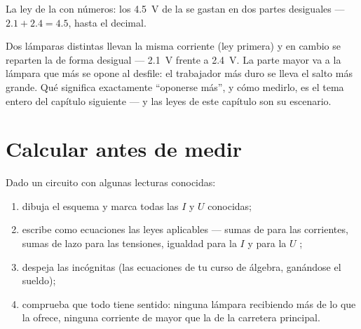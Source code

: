 \begin{omfigure}

{\small La ley de la   con números: los
\qty{4.5}{V} de la  se gastan en dos partes desiguales ---
$2.1 + 2.4 = 4.5$, hasta el decimal.}
\end{omfigure}

\begin{example}\label{ex:g8:circuit-laws:unequal}
Dos lámparas distintas  llevan la misma corriente (ley
primera) y en cambio se reparten la  de forma desigual
--- \qty{2.1}{V} frente a \qty{2.4}{V}. La parte mayor va a la lámpara
que más se opone al desfile: el trabajador más duro se lleva el salto
más grande. Qué significa exactamente ``oponerse más'', y cómo
medirlo, es el tema entero del capítulo siguiente --- y las leyes
de este capítulo son su escenario.
\end{example}

\section{Calcular antes de medir}

\begin{method}\label{met:g8:circuit-laws:solve}
Dado un circuito con algunas lecturas conocidas:
\begin{enumerate}
  \item dibuja el esquema y marca todas las $I$ y $U$ conocidas;
  \item escribe como ecuaciones las leyes aplicables --- sumas de
         para las corrientes, sumas de lazo para las
        tensiones, igualdad para la $I$  y para la $U$
        ;
  \item despeja las incógnitas (las ecuaciones de tu curso de
        álgebra, ganándose el sueldo);
  \item comprueba que todo tiene sentido: ninguna lámpara recibiendo
        más de lo que la  ofrece, ninguna corriente de
         mayor que la de la carretera principal.
\end{enumerate}
\end{method}

